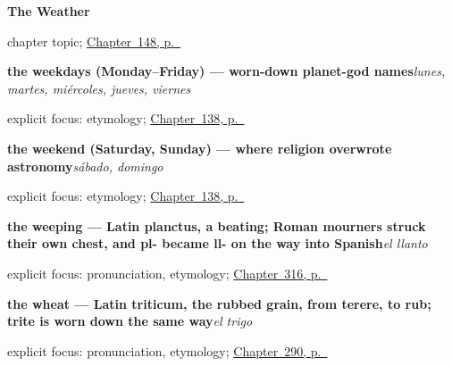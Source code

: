 \noindent\begin{minipage}[t]{\linewidth}
\raggedright
\textbf{The Weather}\par
\footnotesize chapter topic; \hyperref[ch:spanish-weather]{Chapter~148, p.~\pageref*{ch:spanish-weather}}
\end{minipage}\par\smallskip

\noindent\begin{minipage}[t]{\linewidth}
\raggedright
\textbf{the weekdays (Monday–Friday) — worn-down planet-god names}\enspace\emph{lunes, martes, miércoles, jueves, viernes}\par
\footnotesize explicit focus: etymology; \hyperref[ch:spanish-days-of-the-week]{Chapter~138, p.~\pageref*{ch:spanish-days-of-the-week}}
\end{minipage}\par\smallskip

\noindent\begin{minipage}[t]{\linewidth}
\raggedright
\textbf{the weekend (Saturday, Sunday) — where religion overwrote astronomy}\enspace\emph{sábado, domingo}\par
\footnotesize explicit focus: etymology; \hyperref[ch:spanish-days-of-the-week]{Chapter~138, p.~\pageref*{ch:spanish-days-of-the-week}}
\end{minipage}\par\smallskip

\noindent\begin{minipage}[t]{\linewidth}
\raggedright
\textbf{the weeping — Latin planctus, a beating; Roman mourners struck their own chest, and pl- became ll- on the way into Spanish}\enspace\emph{el llanto}\par
\footnotesize explicit focus: pronunciation, etymology; \hyperref[ch:nunca-y-siempre]{Chapter~316, p.~\pageref*{ch:nunca-y-siempre}}
\end{minipage}\par\smallskip

\noindent\begin{minipage}[t]{\linewidth}
\raggedright
\textbf{the wheat — Latin triticum, the rubbed grain, from terere, to rub; trite is worn down the same way}\enspace\emph{el trigo}\par
\footnotesize explicit focus: pronunciation, etymology; \hyperref[ch:lo-que-se-come]{Chapter~290, p.~\pageref*{ch:lo-que-se-come}}
\end{minipage}\par\smallskip

